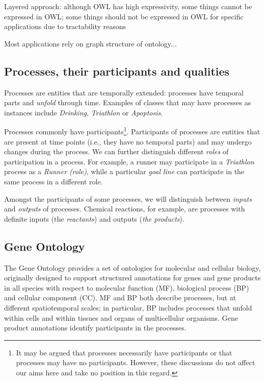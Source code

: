 \documentclass{bioinfo}
\begin{document}
Layered approach: although OWL has high expressivity, some things
cannot be expressed in OWL; some things should not be expressed in OWL
for specific applications due to tractability reasons

Most applications rely on graph structure of ontology...

\subsection{Processes, their participants and qualities}
Processes are entities that are temporally extended: processes have
temporal parts and {\em unfold} through time. Examples of classes that
may have processes as instances include {\em Drinking}, {\em
  Triathlon} or {\em Apoptosis}.

Processes commonly have participants\footnote{It may be argued that
  processes necessarily have participants or that processes may have
  no participants. However, these discussions do not affect our aims
  here and take no position in this regard.}. Participants of
processes are entities that are present at time points (i.e., they
have no temporal parts) and may undergo changes during the process.
We can further distinguish different {\em roles} of participation in a
process. For example, a runner may participate in a {\em Triathlon}
process as a {\em Runner (role)}, while a particular {\em goal line}
can participate in the same process in a different role.

Amongst the participants of some processes, we will distinguish
between {\em inputs} and {\em outputs} of processes. Chemical
reactions, for example, are processes with definite inputs (the {\em
  reactants}) and outputs ({\em the products}).

\subsection{Gene Ontology}

The Gene Ontology provides a set of ontologies for molecular and
cellular biology, originally designed to support structured
annotations for genes and gene products in all species with respect to
molecular function (MF), biological process (BP) and cellular
component (CC). MF and BP both describe processes, but at different
spatiotemporal scales; in particular, BP includes processes that
unfold within cells and within tissues and organs of multicellular
organisms. Gene product annotations identify participants in the
processes.
\end{document}
